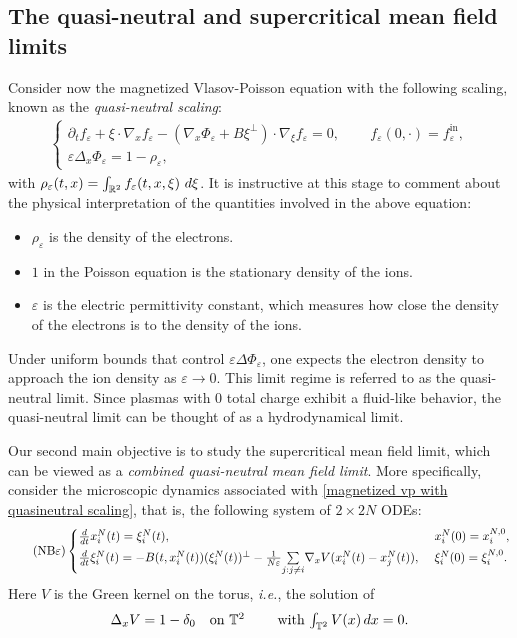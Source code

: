 \documentclass[10pt,a4paper]{amsart}
\def\dd{{\rm d}}
\begin{document}
\subsection{The quasi-neutral and supercritical mean field limits}
Consider now the magnetized Vlasov-Poisson equation with the following scaling, known as the \textit{quasi-neutral scaling}:
\begin{align}\tag{VPB$\varepsilon$}
\begin{cases}
\partial_{t}f_{\varepsilon}+\xi\cdot \nabla_{x}f_{\varepsilon}-(\nabla_{x}\Phi_{\varepsilon}+ B\xi^{\perp})\cdot\nabla_{\xi} f_{\varepsilon}=0, \qquad\, f_{\varepsilon}(0,\cdot)=f^{\mathrm{in}}_{\varepsilon},\\
\varepsilon\Delta_{x} \Phi_{\varepsilon}=1-\rho_{\varepsilon},
\end{cases}
\label{magnetized vp with quasineutral scaling}
\end{align}
with $\rho_{\varepsilon}(t,x)=\int_{\mathbb{R}^{2}} f_{\varepsilon}(t,x,\xi)\ \dd \xi$. 
It is instructive at this stage to comment about the physical interpretation of the quantities involved in the above equation:
\begin{itemize}
     \item[{\rm(i)}] $\rho_{\varepsilon}$ is the density of  the electrons. 
   \item[{\rm(ii)}] $1$ in the Poisson equation
   is the stationary density of the ions. 
   \item[{\rm(iii)}] $\varepsilon$ is the electric permittivity constant, which measures how close the density of the electrons is to the density of the ions.  
\end{itemize}
Under uniform bounds that control $\varepsilon\Delta\Phi_\varepsilon$, one expects the electron density to approach the ion density as $\varepsilon\to0$. This limit regime is referred to as the quasi-neutral limit. 
Since plasmas with $0$ total charge exhibit a fluid-like behavior, 
the quasi-neutral limit can be thought of as a hydrodynamical limit. 

\smallskip
Our second main objective is to study the supercritical mean field limit, which can be viewed as a \textit{combined quasi-neutral mean field limit}. More specifically, consider the microscopic dynamics associated with \eqref{magnetized vp with quasineutral scaling}, that is, the following system of $2\times 2N$ ODEs: 
\vspace{2pt}
\begin{align}\tag{NB$\varepsilon$}
 \begin{cases}
\frac{\dd}{\dd t}x_{i}^{N}(t)=\xi_{i}^{N}(t), &\,\, x_{i}^{N}(0)=x_{i}^{N,0},\\[1mm]
\frac{\dd}{\dd t}\xi_{i}^{N}(t)=-B(t,x_{i}^{N}(t))(\xi_{i}^{N}(t))^{\perp}-\frac{1}{N\varepsilon}\underset{j:j\neq i}{\sum}\nabla_{x} V(x_{i}^{N}(t)-x_{j}^{N}(t)),
&\,\,\xi_{i}^{N}(0)=\xi_{i}^{N,0}. 
\end{cases} 
\label{trajectories intro}
\end{align}
Here $V$ is the Green kernel on the torus, {\it i.e.}, the solution of 
$$
\Delta_{x}V=1-\delta_{0} 
\quad \mbox{on $\mathbb{T}^{2}\qquad$  \text{with} $\int_{\mathbb{T}^{2}}V(x)\, \dd x=0$}.$$
\end{document}
